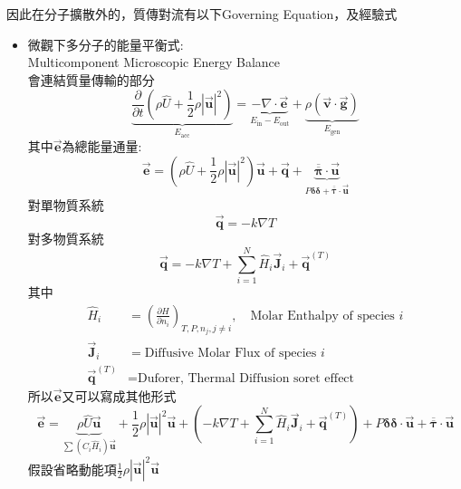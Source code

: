 \documentclass[../main.tex]{subfiles}
\begin{document}
\begin{itemize}
  因此在分子擴散外的，質傳對流有以下Governing Equation，及經驗式
  \begin{itemize}
    \item 微觀下多分子的能量平衡式:\\
    Multicomponent Microscopic Energy Balance\\
    會連結質量傳輸的部分
    \begin{equation}
      \underbrace{\frac{\partial}{\partial t}\left(
        \rho \hat U + \frac{1}{2}\rho\left|\vec{\bm u}\right|^2
      \right)}_{E_{\text{acc}}} = \underbrace{-\nabla\cdot \vec{\bm e}}_{E_{\text{in}}-E_{\text{out}}}
      + \underbrace{\rho\left(\vec{\bm v}\cdot \vec{\bm g}\right)}_{E_{\text{gen}}}
    \end{equation}
    其中$\vec{\bm e}$為總能量通量:
    \begin{equation}
      \boxed{\vec{\bm e} = \left(\rho \hat U + \frac{1}{2}\rho\left|\vec{\bm u}\right|^2\right)\vec{\bm u} 
      + \vec{\bm q} + \underbrace{ \overline{\overline{\bm \pi}} \cdot \vec{\bm u}}_{P\bm \delta\bm\delta 
      + \overline{\overline{\bm \tau}}\cdot \vec{\bm u}}}
    \end{equation}
    對單物質系統
    \begin{equation}
      \vec{\bm q} = -k\nabla T
    \end{equation}
    對多物質系統
    \begin{equation}
      \vec{\bm q} = -k\nabla T + \sum_{i=1}^N \hat H_i \vec{\bm J}_i + \vec{\bm q}^{(T)}
    \end{equation}
    其中
    \begin{align}
      \hat H_i &= \left(\frac{\partial H}{\partial n_i}\right)_{T,P,n_j,j\neq i}, \quad \text{Molar Enthalpy of species }i\\
      \vec{\bm J}_i &= \text{Diffusive Molar Flux of species }i\\
      \vec{\bm q}^{(T)} &= \text{Duforer, Thermal Diffusion soret effect}
    \end{align}
    所以$\vec{\bm e}$又可以寫成其他形式
    \begin{equation}
      \boxed{\vec{\bm e} = \underbrace{\rho \hat U\vec{\bm u}}_{
        \sum (C_i\hat H_i) \vec{\bm u}
      } + \frac{1}{2}\rho\left|\vec{\bm u}\right|^2\vec{\bm u}
      + \left(-k\nabla T + \sum_{i=1}^N \hat H_i \vec{\bm J}_i + \vec{\bm q}^{(T)}\right)
      + P\bm \delta\bm\delta \cdot \vec{\bm u} + \overline{\overline{\bm \tau}}\cdot \vec{\bm u}}
    \end{equation}
    假設省略動能項$\frac{1}{2}\rho\left|\vec{\bm u}\right|^2\vec{\bm u}$

\end{itemize}
\end{itemize}
\end{document}

